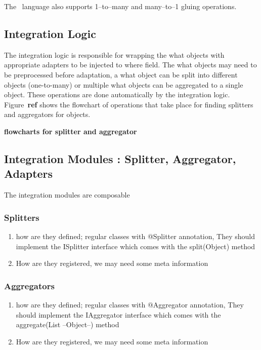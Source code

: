\documentclass{llncs}
\begin{document}
The \gluer~language also supports 1--to--many and many--to--1 gluing operations. 




\subsection{Integration Logic}
\label{sec:zamk:logic}
The integration logic is responsible for wrapping the what objects with appropriate adapters to be injected to where field. 
The what objects may need to be preprocessed before adaptation, a what object can be split into different objects (one-to-many) or multiple what objects can be aggregated to a single object. 
These operations are done automatically by the integration logic. Figure~\textbf{ref} shows the flowchart of operations that take place for finding splitters and aggregators for objects.

\textbf{flowcharts for splitter and aggregator}

\subsection{Integration Modules : Splitter, Aggregator, Adapters}
\label{sec:zamk:modules}

The integration modules are composable 

\subsubsection{Splitters}
\begin{enumerate}
\item how are they defined; regular classes with @Splitter annotation, They should implement the ISplitter interface which comes with the split(Object) method
\item How are they registered, we may need some meta information
\end{enumerate}

\subsubsection{Aggregators}
\begin{enumerate}
\item how are they defined; regular classes with @Aggregator annotation, They should implement the IAggregator interface which comes with the aggregate(List --Object--) method
\item How are they registered, we may need some meta information
\end{enumerate}
\end{document}
